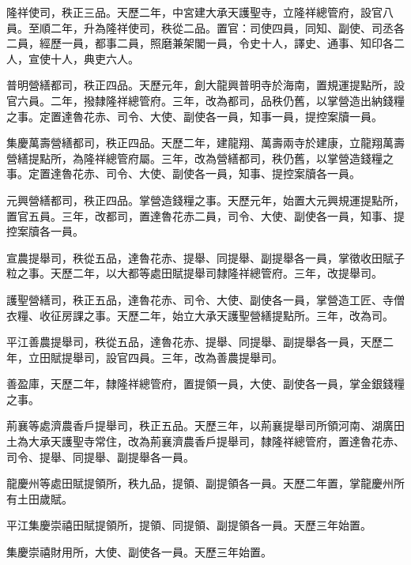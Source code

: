 \begin{pinyinscope}
 隆祥使司，秩正三品。天歷二年，中宮建大承天護聖寺，立隆祥總管府，設官八員。至順二年，升為隆祥使司，秩從二品。置官：司使四員，同知、副使、司丞各二員，經歷一員，都事二員，照磨兼架閣一員，令史十人，譯史、通事、知印各二人，宣使十人，典吏六人。



 普明營繕都司，秩正四品。天歷元年，創大龍興普明寺於海南，置規運提點所，設官六員。二年，撥隸隆祥總管府。三年，改為都司，品秩仍舊，以掌營造出納錢糧之事。定置達魯花赤、司令、大使、副使各一員，知事一員，提控案牘一員。



 集慶萬壽營繕都司，秩正四品。天歷二年，建龍翔、萬壽兩寺於建康，立龍翔萬壽營繕提點所，為隆祥總管府屬。三年，改為營繕都司，秩仍舊，以掌營造錢糧之事。定置達魯花赤、司令、大使、副使各一員，知事、提控案牘各一員。



 元興營繕都司，秩正四品。掌營造錢糧之事。天歷元年，始置大元興規運提點所，置官五員。三年，改都司，置達魯花赤二員，司令、大使、副使各一員，知事、提控案牘各一員。



 宣農提舉司，秩從五品，達魯花赤、提舉、同提舉、副提舉各一員，掌徵收田賦子粒之事。天歷二年，以大都等處田賦提舉司隸隆祥總管府。三年，改提舉司。



 護聖營繕司，秩正五品，達魯花赤、司令、大使、副使各一員，掌營造工匠、寺僧衣糧、收征房課之事。天歷二年，始立大承天護聖營繕提點所。三年，改為司。



 平江善農提舉司，秩從五品，達魯花赤、提舉、同提舉、副提舉各一員，天歷二年，立田賦提舉司，設官四員。三年，改為善農提舉司。



 善盈庫，天歷二年，隸隆祥總管府，置提領一員，大使、副使各一員，掌金銀錢糧之事。



 荊襄等處濟農香戶提舉司，秩正五品。天歷三年，以荊襄提舉司所領河南、湖廣田土為大承天護聖寺常住，改為荊襄濟農香戶提舉司，隸隆祥總管府，置達魯花赤、司令、提舉、同提舉、副提舉各一員。



 龍慶州等處田賦提領所，秩九品，提領、副提領各一員。天歷二年置，掌龍慶州所有土田歲賦。



 平江集慶崇禧田賦提領所，提領、同提領、副提領各一員。天歷三年始置。



 集慶崇禧財用所，大使、副使各一員。天歷三年始置。




\end{pinyinscope}
